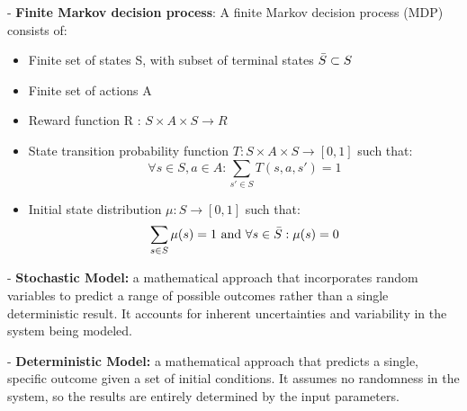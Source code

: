 - \textbf{Finite Markov decision process}: A finite Markov decision process
(MDP) consists of: 
\begin{itemize}
    \item Finite set of states S, with subset of terminal states $\Bar{S} \subset S$
    \item  Finite set of actions A
    \item Reward function R : $S × A × S \rightarrow R$
    \item State transition probability function $T : S × A × S \rightarrow [0, 1]$ such that:
    \begin{equation}
    \forall s \in S, a \in A: \sum_{s' \in S} T(s,a,s') = 1
\end{equation}
    \item Initial state distribution $\mu : S \rightarrow [0, 1]$ such that:
\begin{equation}
    \sum _{s \in S} \mu (s) = 1\  \text{and} \ \forall s \in \Bar{S}: \mu (s) =0 \end{equation}
\end{itemize}






- \textbf{Stochastic Model: } a mathematical approach that incorporates random variables to predict a range of possible outcomes rather than a single deterministic result. It accounts for inherent uncertainties and variability in the system being modeled.


- \textbf{Deterministic Model: }a mathematical approach that predicts a single, specific outcome given a set of initial conditions. It assumes no randomness in the system, so the results are entirely determined by the input parameters.




